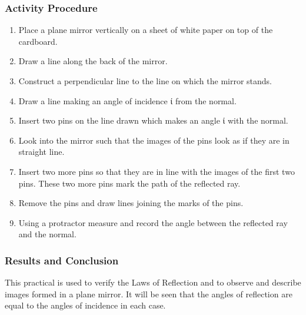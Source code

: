 \subsubsection{Activity Procedure}
\begin{enumerate}
\item{Place a plane mirror vertically on a sheet of white paper on top of the cardboard.}
\item{Draw a line along the back of the mirror.}
\item{Construct a perpendicular line to the line on which the mirror stands.}  
\item{Draw a line making an angle of incidence ί from the normal.}
\item{Insert two pins on the line drawn which makes an angle ί with the normal.}
\item{Look into the mirror such that the images of the pins look as if they are in straight line.}
\item{Insert two more pins so that they are in line with the images of the first two pins.  These two more pins mark the path of the reflected ray.}
\item{Remove the pins and draw lines joining the marks of the pins.}
\item{Using a protractor measure and record the angle between the reflected ray and the normal.}
\end{enumerate}

\subsubsection*{Results and Conclusion}
This practical is used to verify the Laws of Reflection and to observe and describe images formed in a plane mirror.  It will be seen that the angles of reflection are equal to the angles of incidence in each case.
